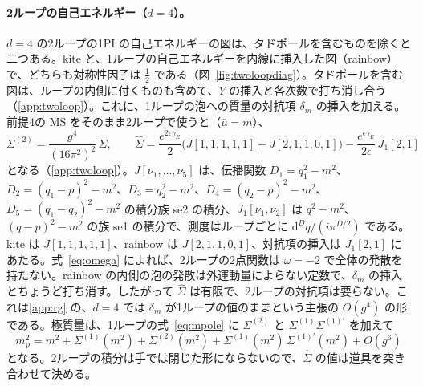 \documentclass[a4paper,10pt]{ltjsarticle}
\newcommand{\dd}{\mathrm{d}}
\begin{document}
\paragraph{2ループの自己エネルギー（$d=4$）。}$d=4$ の2ループの1PI の自己エネルギーの図は、タドポールを含むものを除くと二つある。kite と、1ループの自己エネルギーを内線に挿入した図（rainbow）で、どちらも対称性因子は $\frac12$ である（図~\ref{fig:twoloopdiag}）。タドポールを含む図は、ループの内側に付くものも含めて、$Y$ の挿入と各次数で打ち消し合う（\ref{app:twoloop}）。これに、1ループの泡への質量の対抗項 $\delta_m$ の挿入を加える。前提4の $\overline{\mathrm{MS}}$ をそのまま2ループで使うと（$\bar\mu=m$）、
\begin{equation}
\Sigma^{(2)}=\frac{g^4}{(16\pi^2)^2}\,\hat\Sigma,\qquad
\hat\Sigma=\frac{e^{2\epsilon\gamma_E}}2\bigl(J[1,1,1,1,1]+J[2,1,1,0,1]\bigr)-\frac{e^{\epsilon\gamma_E}}{2\epsilon}\,J_1[2,1]
\label{eq:sigma2}
\end{equation}
となる（\ref{app:twoloop}）。$J[\nu_1,\ldots,\nu_5]$ は、伝播関数 $D_1=q_1^2-m^2$、$D_2=(q_1-p)^2-m^2$、$D_3=q_2^2-m^2$、$D_4=(q_2-p)^2-m^2$、$D_5=(q_1-q_2)^2-m^2$ の積分族 se2 の積分、$J_1[\nu_1,\nu_2]$ は $q^2-m^2$、$(q-p)^2-m^2$ の族 se1 の積分で、測度はループごとに $\dd^Dq/(i\pi^{D/2})$ である。kite は $J[1,1,1,1,1]$、rainbow は $J[2,1,1,0,1]$、対抗項の挿入は $J_1[2,1]$ にあたる。式~\eqref{eq:omega} によれば、2ループの2点関数は $\omega=-2$ で全体の発散を持たない。rainbow の内側の泡の発散は外運動量によらない定数で、$\delta_m$ の挿入とちょうど打ち消す。したがって $\hat\Sigma$ は有限で、2ループの対抗項は要らない。これは\ref{app:rg} の、$d=4$ では $\delta_m$ が1ループの値のままという主張の $O(g^4)$ の形である。極質量は、1ループの式~\eqref{eq:mpole} に $\Sigma^{(2)}$ と $\Sigma^{(1)}\Sigma^{(1)\prime}$ を加えて
\begin{equation}
m_{\mathrm p}^2=m^2+\Sigma^{(1)}(m^2)+\Sigma^{(2)}(m^2)+\Sigma^{(1)}(m^2)\,\Sigma^{(1)\prime}(m^2)+O(g^6)
\label{eq:mpole2}
\end{equation}
となる。2ループの積分は手では閉じた形にならないので、$\hat\Sigma$ の値は道具を突き合わせて決める。
\end{document}
